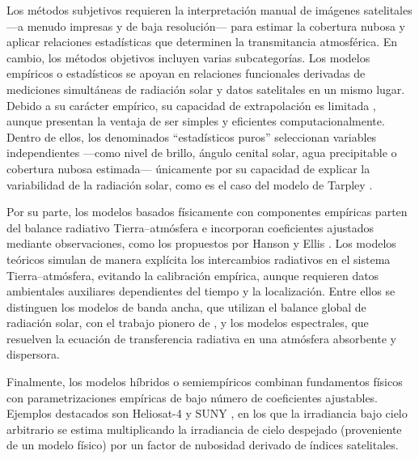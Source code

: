 \documentclass[letterpaper,12pt, twoside]{report}
\providecommand{\DIFdeltex}[1]{{\protect\color{red} \scriptsize #1}} %
\providecommand{\DIFdel}[1]{\texorpdfstring{\DIFdeltex{#1}}{}} %
\begin{document}
\DIFdel{Los métodos subjetivos requieren la interpretación manual de imágenes satelitales —a menudo impresas y de baja resolución— para estimar la cobertura nubosa y aplicar relaciones estadísticas que determinen la transmitancia atmosférica. En cambio, los métodos objetivos incluyen varias subcategorías. Los modelos empíricos o estadísticos se apoyan en relaciones funcionales derivadas de mediciones simultáneas de radiación solar y datos satelitales en un mismo lugar. Debido a su carácter empírico, su capacidad de extrapolación es limitada \cite{Laguarda2021}, aunque presentan la ventaja de ser simples y eficientes computacionalmente. Dentro de ellos, los denominados “estadísticos puros” seleccionan variables independientes —como nivel de brillo, ángulo cenital solar, agua precipitable o cobertura nubosa estimada— únicamente por su capacidad de explicar la variabilidad de la radiación solar, como es el caso del modelo de Tarpley \cite{Tarpley1979}.
}%

\DIFdel{Por su parte, los modelos basados físicamente con componentes empíricas parten del balance radiativo Tierra–atmósfera e incorporan coeficientes ajustados mediante observaciones, como los propuestos por Hanson \cite{Hanson1976} y Ellis \cite{Ellis1978}. Los modelos teóricos simulan de manera explícita los intercambios radiativos en el sistema Tierra–atmósfera, evitando la calibración empírica, aunque requieren datos ambientales auxiliares dependientes del tiempo y la localización. Entre ellos se distinguen los modelos de banda ancha, que utilizan el balance global de radiación solar, con el trabajo pionero de \cite{Gautier1980}, y los modelos espectrales, que resuelven la ecuación de transferencia radiativa en una atmósfera absorbente y dispersora.
}%

\DIFdel{Finalmente, los modelos híbridos o semiempíricos combinan fundamentos físicos con parametrizaciones empíricas de bajo número de coeficientes ajustables. Ejemplos destacados son Heliosat-4 \cite{qu2017} y SUNY \cite{Perez2002}, en los que la irradiancia bajo cielo arbitrario se estima multiplicando la irradiancia de cielo despejado (proveniente de un modelo físico) por un factor de nubosidad derivado de índices satelitales.
}%
\end{document}
